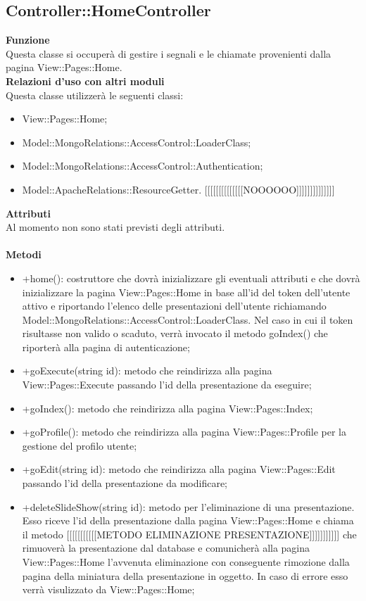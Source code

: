 {			\subsection{Controller::HomeController}{
					\label{sub:homecontroller}
					\textbf{Funzione}\\
					\indent Questa classe si occuperà di gestire i segnali e le chiamate provenienti dalla pagina View::Pages::Home.\\
					\textbf{Relazioni d'uso con altri moduli}\\
					\indent Questa classe utilizzerà le seguenti classi:
					\begin{itemize}
						\item View::Pages::Home;
						\item Model::MongoRelations::AccessControl::LoaderClass;
						\item Model::MongoRelations::AccessControl::Authentication;
						\item Model::ApacheRelations::ResourceGetter. [[[[[[[[[[[[[[NOOOOOO]]]]]]]]]]]]]]
					\end{itemize}
					\textbf{Attributi}\\
					\indent Al momento non sono stati previsti degli attributi.\\\\
					\textbf{Metodi}
					\begin{itemize}
						\item +home(): costruttore che dovrà inizializzare gli eventuali attributi e che dovrà inizializzare la pagina View::Pages::Home in base all'id del token dell'utente attivo e riportando l'elenco delle presentazioni dell'utente richiamando Model::MongoRelations::AccessControl::LoaderClass. Nel caso in cui il token risultasse non valido o scaduto, verrà invocato il metodo goIndex() che riporterà alla pagina di autenticazione;
						\item +goExecute(string id): metodo che reindirizza alla pagina View::Pages::Execute passando l'id della presentazione da eseguire;
						\item +goIndex(): metodo che reindirizza alla pagina View::Pages::Index;
						\item +goProfile(): metodo che reindirizza alla pagina View::Pages::Profile per la gestione del profilo utente;
						\item +goEdit(string id): metodo che reindirizza alla pagina View::Pages::Edit passando l'id della presentazione da modificare;
						\item +deleteSlideShow(string id): metodo per l'eliminazione di una presentazione. Esso riceve l'id della presentazione dalla pagina View::Pages::Home e chiama il metodo [[[[[[[[[[[METODO ELIMINAZIONE PRESENTAZIONE]]]]]]]]]]] che rimuoverà la presentazione dal database e comunicherà alla pagina View::Pages::Home l'avvenuta eliminazione con conseguente rimozione dalla pagina della miniatura della presentazione in oggetto. In caso di errore esso verrà visulizzato da View::Pages::Home; 

\end{itemize}}}
